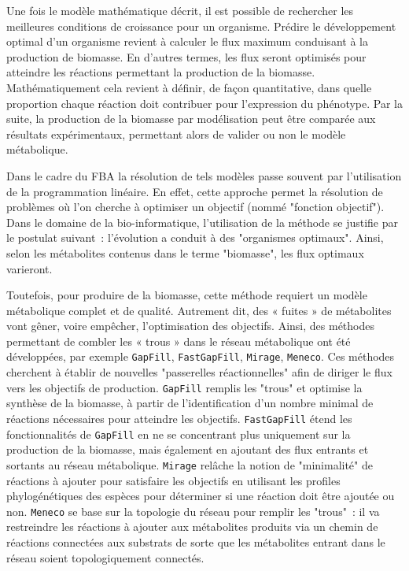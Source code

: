 \begin{refsegment}
    Une fois le modèle mathématique décrit, il est possible de rechercher les meilleures conditions de croissance pour un organisme. Prédire le développement optimal d'un organisme revient à calculer le flux maximum conduisant à la production de biomasse. En d'autres termes, les flux seront optimisés pour atteindre les réactions permettant la production de la biomasse. Mathématiquement cela revient à définir, de façon quantitative, dans quelle proportion chaque réaction doit contribuer pour l'expression du phénotype. Par la suite, la production de la biomasse par modélisation peut être comparée aux résultats expérimentaux, permettant alors de valider ou non le modèle métabolique.
    
    
    Dans le cadre du \gls{FBA} la résolution de tels modèles passe souvent par l'utilisation de la programmation linéaire. En effet, cette approche permet la résolution de problèmes où l'on cherche à optimiser un objectif (nommé "fonction objectif"). Dans le domaine de la bio-informatique, l'utilisation de la méthode se justifie par le postulat suivant : l'évolution a conduit à des "organismes optimaux". Ainsi, selon les métabolites contenus dans le terme "biomasse", les flux optimaux varieront.
    
    Toutefois, pour produire de la biomasse, cette méthode requiert un modèle métabolique complet et de qualité. Autrement dit, des « fuites » de métabolites vont gêner, voire empêcher, l'optimisation des objectifs. Ainsi, des méthodes permettant de combler les « trous » dans le réseau métabolique ont été développées, par exemple \texttt{GapFill}\cite{kumar2007optimization}, \texttt{FastGapFill}\cite{thiele2014fastgapfill}, \texttt{Mirage}\cite{vitkin2012mirage}, \texttt{Meneco}\cite{prigent2017meneco}. Ces méthodes cherchent à établir de nouvelles "passerelles réactionnelles" afin de diriger le flux vers les objectifs de production. \texttt{GapFill} remplis les "trous" et optimise la synthèse de la biomasse, à partir de l'identification d'un nombre minimal de réactions nécessaires pour atteindre les objectifs. \texttt{FastGapFill} étend les fonctionnalités de \texttt{GapFill} en ne se concentrant plus uniquement sur la production de la biomasse, mais également en ajoutant des flux entrants et sortants au réseau métabolique. \texttt{Mirage} relâche la notion de "minimalité" de réactions à ajouter pour satisfaire les objectifs en utilisant les profiles phylogénétiques des espèces pour déterminer si une réaction doit être ajoutée ou non. \texttt{Meneco} se base sur la topologie du réseau pour remplir les "trous" : il va restreindre les réactions à ajouter aux métabolites produits via un chemin de réactions connectées aux substrats de sorte que les métabolites entrant dans le réseau soient topologiquement connectés.
    

\end{refsegment}
